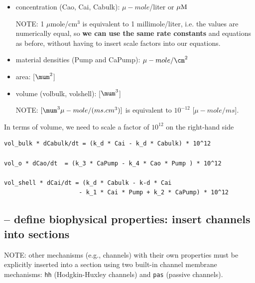 \begin{itemize}
  \item concentration (Cao, Cai, Cabulk): $\mu-mole$/liter or ${\mu\text{M}}$

NOTE: 1 $\mu$mole/cm$^3$ is equivalent to 1 millimole/liter, i.e. the values are
numerically equal, so {\bf we can use the same rate constants} and equations as
before, without having to insert scale factors into our equations.
  
  \item material densities (Pump and CaPump): $\mu-mole/\cm^2$
 
  \item area: [$\mum^2$]
  
  
  \item volume (volbulk, volshell): [$\mum^3$]

NOTE: $[\mum^3 \mu-mole/(ms. cm^3)]$ is equivalent to $10^{-12}$
[$\mu-mole/ms$].

\end{itemize}

In terms of volume, we need to scale a factor of $10^{12}$ on the right-hand
side

\begin{verbatim}
vol_bulk * dCabulk/dt = (k_d * Cai - k_d * Cabulk) * 10^12

vol_o * dCao/dt  = (k_3 * CaPump - k_4 * Cao * Pump ) * 10^12

vol_shell * dCai/dt = (k_d * Cabulk - k-d * Cai
                     - k_1 * Cai * Pump + k_2 * CaPump) * 10^12
\end{verbatim}



\subsection{-- define biophysical properties: insert channels into sections}


NOTE: other mechanisms (e.g., channels) with their own properties must
be explicitly inserted into a section using two built-in channel membrane
mechanisms: \verb!hh! (Hodgkin-Huxley channels) and \verb!pas! (passive
channels).

